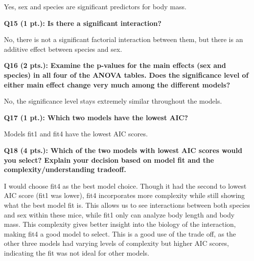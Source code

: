 \documentclass[
]{article}
\begin{document}
Yes, sex and species are significant predictors for body mass.

\textbf{Q15 (1 pt.): Is there a significant interaction?}

No, there is not a significant factorial interaction between them, but
there is an additive effect between species and sex.

\textbf{Q16 (2 pts.): Examine the p-values for the main effects (sex and
species) in all four of the ANOVA tables. Does the significance level of
either main effect change very much among the different models?}

No, the significance level stays extremely similar throughout the
models.

\textbf{Q17 (1 pt.): Which two models have the lowest AIC?}

Models fit1 and fit4 have the lowest AIC scores.

\textbf{Q18 (4 pts.): Which of the two models with lowest AIC scores
would you select? Explain your decision based on model fit and the
complexity/understanding tradeoff.}

I would choose fit4 as the best model choice. Though it had the second
to lowest AIC score (fit1 was lower), fit4 incorporates more complexity
while still showing what the best model fit is. This allows us to see
interactions between both species and sex within these mice, while fit1
only can analyze body length and body mass. This complexity gives better
insight into the biology of the interaction, making fit4 a good model to
select. This is a good use of the trade off, as the other three models
had varying levels of complexity but higher AIC scores, indicating the
fit was not ideal for other models.
\end{document}
